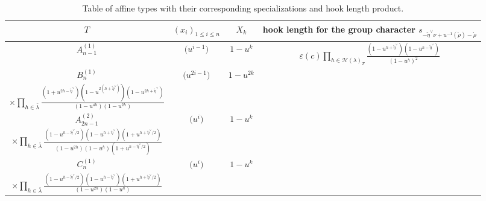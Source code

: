 \documentclass[10pt,a4paper]{amsart}
\numberwithin{equation}{section}
\def\cch{\mathcal H}
\begin{document}
\begin{table}[th]\centering\renewcommand{\arraystretch}{1.52}
\caption{Table of affine types with their corresponding specializations and hook length product.}\label{tableau3}

\begin{tabular}{|c|c|c|c|}
\hline
$T$ & $(x_i)_{1\leq i\leq n}$ & $X_k$ & hook length for the group character $s_{-\tilde{\eta}^{\vee }\nu +u^{-1}(\mathring{\rho})-\mathring{\rho}}$\\
\hline
\rule{0pt}{15pt} $A^{(1)}_{n-1}$ & $\bigl(u^{i-1}\bigr)$ & $1-u^k$&
$\varepsilon(c)\displaystyle\prod_{h\in\cch(\lambda)_T} \frac{(1-u^{h+\tilde{\eta}^{\vee}})(1-u^{h-\tilde{\eta}^{\vee}})}{(1-u^h)^2}$\\
\hline
\rule{0pt}{15pt} $B^{(1)}_{n}$& $\bigl(u^{2i-1}\bigr)$ & $1-u^{2k}$&
\makecell{
$\varepsilon(c)\displaystyle u^{-\tilde{\eta}^{\vee}\ell\bigl(\bar{\lambda}\bigr)}\prod_{h\in\cch(\lambda)_T} \frac{(1-u^{2(h-\tilde{\eta}^{\vee})})(1-u^{2(h+\tilde{\eta}^{\vee})})}{(1-u^{2h})^2}$\vspace{1mm}\\ $\displaystyle\times\prod_{h\in\bar{\lambda}}\frac{(1+u^{2h-\tilde{\eta}^{\vee}})(1-u^{2(h+\tilde{\eta}^{\vee})})(1-u^{2h+\tilde{\eta}^{\vee}})}{(1-u^{4h})(1-u^{2h})}$}
\\
\hline
\rule{0pt}{15pt}$A^{(2)}_{2n-1}$ & $\bigl(u^{i}\bigr)$ & $1-u^{k}$&\makecell{
$\varepsilon(c)(-1)^{\ell\bigl(\bar{\lambda}\bigr)}\displaystyle u^{-\ell\bigl(\bar{\lambda}\bigr)\tilde{\eta}^{\vee}/2}\prod_{h\in\cch(\lambda)_T} \frac{(1-u^{h-\tilde{\eta}^{\vee}})(1-u^{h+\tilde{\eta}^{\vee}})}{(1-u^{h})^2}$\vspace{1mm}\\
$\displaystyle \times
\prod_{h\in\bar{\lambda}}\frac{(1-u^{h-\tilde{\eta}^{\vee}/2})(1-u^{h+\tilde{\eta}^{\vee}}) (1+u^{h+\tilde{\eta}^{\vee}/2})}{(1-u^{2h})(1-u^{h})(1+u^{h-\tilde{\eta}^{\vee}/2})}$}
\\
\hline
\rule{0pt}{15pt}$C^{(1)}_{n}$& $\bigl(u^{i}\bigr)$ & $1-u^{k}$&\makecell{
$\displaystyle \varepsilon(c)u^{\ell\bigl(\bar{\lambda}\bigr)\tilde{\eta}^{\vee}/2}
\prod_{h\in\cch(\lambda)_T}\frac{(1-u^{h-\tilde{\eta}^{\vee}})(1-u^{h+\tilde{\eta}^{\vee}})}{(1-u^{h})^2}
$\vspace{1mm}\\  $\displaystyle\times\prod_{h\in\bar{\lambda}}\frac{(1-u^{h-\tilde{\eta}^{\vee}/2})(1-u^{h-\tilde{\eta}^{\vee}})(1+u^{h+\tilde{\eta}^{\vee}/2})}{(1-u^{2h})(1-u^{h})}$}\\

\end{tabular}
\end{table}
\end{document}
